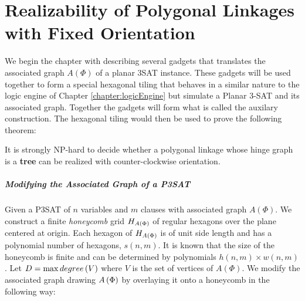 \chapter{Realizability of Polygonal Linkages with Fixed Orientation\label{chapter:polygonalLinkage}}

We begin the chapter with describing several gadgets that translates the associated graph $A(\Phi)$ of a planar 3SAT instance.  
These gadgets will be used together to form a special hexagonal tiling that behaves in a similar nature to the logic engine of Chapter \ref{chapter:logicEngine} but simulate a Planar 3-SAT and its associated graph.
Together the gadgets will form what is called the auxilary construction.
The hexagonal tiling would then be used to prove the following theorem:
\begin{thm}\label{thm:hinge2}
It is strongly NP-hard to decide whether a polygonal linkage whose hinge graph is a \textbf{tree} can be realized with counter-clockwise orientation.
\end{thm}

\paragraph{Modifying the Associated Graph of a P3SAT}

Given a P3SAT of $n$ variables and $m$ clauses with associated graph $A(\Phi)$. 
We construct a finite \textit{honeycomb} grid $H_{A \left( \Phi \right)}$ of regular hexagons over the plane centered at origin.
Each hexagon of $H_{A \left( \Phi \right)}$ is of unit side length and has a polynomial number of hexagons, $s(n,m)$.
It is known that the size of the honeycomb is finite and can be determined by polynomials $h(n,m) \times w(n,m)$ \cite{BK+98}.
Let $D = \max degree\left(  V  \right)$ where $V$ is the set of vertices of $A(\Phi)$.
We modify the associated graph drawing $A\left( \Phi \right)$ by overlaying it onto a honeycomb in the following way:


